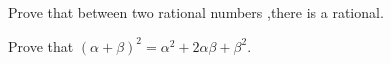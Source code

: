\begin{exercise}
\item Prove that between two rational numbers ,there is a rational.
\item Prove that $(\alpha + \beta)^2 = \alpha^2 + 2 \alpha \beta + \beta^2$.
\end{exercise}
